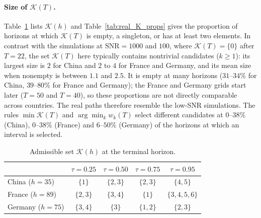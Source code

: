 \documentclass[12pt,a4paper]{article}
\begin{document}
\paragraph{Size of $\mathcal K(T)$.}
Table~\ref{tab:real_K_terminal} lists $\mathcal K(h)$ and
Table~\ref{tab:real_K_props} gives the proportion of horizons at which
$\mathcal K(T)$ is empty, a singleton, or has at least two elements.
In contrast with the simulations at $\mathrm{SNR}=1000$ and $100$, where
$\mathcal K(T)=\{0\}$ after $T=22$, the set $\mathcal K(T)$ here
typically contains nontrivial candidates ($k\ge1$): its largest size is
$2$ for China and $2$ to $4$ for France and Germany, and its mean size
when nonempty is between $1.1$ and $2.5$. It is empty at many horizons
($31$--$34\%$ for China, $39$--$80\%$ for France and Germany); the
France and Germany grids start later ($T=50$ and $T=40$), so these
proportions are not directly comparable across countries. The real
paths therefore resemble the low-SNR simulations. The rules $\min\mathcal K(T)$
and $\arg\min_k w_k(T)$ select different candidates at
$0$--$38\%$ (China), $0$--$38\%$ (France) and $6$--$50\%$ (Germany) of the
horizons at which an interval is selected.

\begin{table}[htbp]
	\centering
	\small
	\caption{Admissible set $\mathcal K(h)$ at the terminal horizon.}
	\label{tab:real_K_terminal}
	\begin{tabular}{lcccc}
		\toprule
		& $\tau=0.25$ & $\tau=0.50$ & $\tau=0.75$ & $\tau=0.95$ \\
		\midrule
		China ($h=35$)   & $\{1\}$   & $\{2,3\}$ & $\{2,3\}$ & $\{4,5\}$ \\
		France ($h=89$)  & $\{2,3\}$ & $\{3,4\}$ & $\{1\}$   & $\{3,4,5,6\}$ \\
		Germany ($h=75$) & $\{3,4\}$ & $\{3\}$   & $\{1,2\}$ & $\{2,3\}$ \\
		\bottomrule
	\end{tabular}
\end{table}
\end{document}
